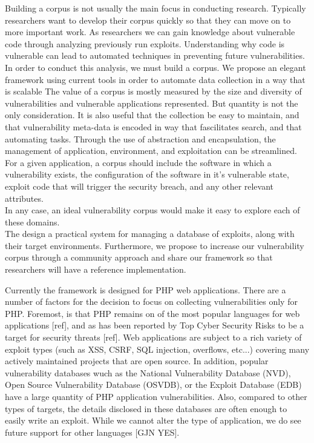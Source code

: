 \documentclass[letterpaper,twocolumn,10pt]{article}
\begin{document}
Building a corpus is not usually the main focus in conducting research.  Typically researchers want to develop their corpus quickly so that they can move on to more important work. As researchers we can gain knowledge about vulnerable code through analyzing previously run exploits.  Understanding why code is vulnerable can lead to automated techniques in preventing future vulnerabilities.  In order to conduct this analysis, we must build a corpus. We propose an elegant framework using current tools in order to automate data collection in a way that is scalable
The value of a corpus is mostly measured by the size and diversity of vulnerabilities and vulnerable applications represented. But quantity is not the only consideration. It is also useful that the collection be easy to maintain, and that vulnerability meta-data is encoded in way that fascilitates search, and that automating tasks. Through the use of abstraction and encapsulation, the management of application, environment, and exploitation can be streamlined. 
For a given application, a corpus should include the software in which a vulnerability exists, the configuration of the software in it's vulnerable state, exploit code that will trigger the security breach, and any other relevant attributes.\\

In any case, an ideal vulnerability corpus would make it easy to explore each of these domains.\\ 
The design a practical system for managing a database of exploits, along with their target environments. Furthermore, we propose to increase our vulnerability corpus through a community approach and share our framework so that researchers will have a reference implementation.


Currently the framework is designed for PHP web applications. There are a number of factors for the decision to focus on collecting vulnerabilities only for PHP. Foremost, is that PHP remains on of the most popular languages for web applications [ref], and as has been reported by Top Cyber Security Risks to be a target for security threats [ref]. Web applications are subject to a rich variety of exploit types (such as XSS, CSRF, SQL injection, overflows, etc...) covering many actively maintained projects that are open source. In addition, popular vulnerability databases wuch as the National Vulnerability Database (NVD), Open Source Vulnerability Database (OSVDB), or the Exploit Database (EDB) have a large quantity of PHP application vulnerabilities. Also, compared to other types of targets, the details disclosed in these databases are often enough to easily write an exploit. 
While we cannot alter the type of application, we do see future support for other languages [GJN YES].
\end{document}
